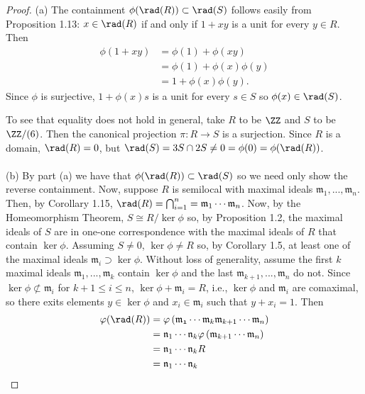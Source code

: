 \begin{proof}
(a) The containment $\phi(\rad(R))\subset\rad(S)$ follows easily
from Proposition 1.13: $x\in\rad(R)$ if and only if $1+xy$ is a
unit for every $y\in R$. Then
\begin{align*}
\phi(1+xy)&=\phi(1)+\phi(xy)\\
          &=\phi(1)+\phi(x)\phi(y)\\
          &=1+\phi(x)\phi(y).
\end{align*}
Since $\phi$ is surjective, $1+\phi(x)s$ is a unit for every
$s\in S$ so $\phi(x)\in\rad(S)$.

To see that equality does not hold in general, take $R$ to be
$\ZZ$ and $S$ to be $\ZZ/(6)$. Then the canonical projection
$\pi\colon R\to S$ is a surjection. Since $R$ is a domain,
$\rad(R)=0$, but $\rad(S)= 3S\cap 2S\neq
0=\phi(0)=\phi(\rad(R))$.
\\\\
(b) By part (a) we have that $\phi(\rad(R))\subset\rad(S)$ so we
need only show the reverse containment. Now, suppose $R$ is
semilocal with maximal ideals
$\mathfrak{m}_1,...,\mathfrak{m}_n$. Then, by Corollary 1.15,
$\rad(R)=\bigcap_{i=1}^n=\mathfrak{m}_1\cdots\mathfrak{m}_n$. Now,
by the Homeomorphism Theorem, $S\cong R/\ker\phi$ so, by
Proposition 1.2, the maximal ideals of $S$ are in one-one
correspondence with the maximal ideals of $R$ that contain
$\ker\phi$. Assuming $S\neq 0$, $\ker\phi\neq R$ so, by Corollary
1.5, at least one of the maximal ideals
$\mathfrak{m}_i\supset\ker\phi$. Without loss of generality,
assume the first $k$ maximal ideals
$\mathfrak{m}_1,...,\mathfrak{m}_k$ contain $\ker\phi$ and the
last $\mathfrak{m}_{k+1},...,\mathfrak{m}_n$ do not. Since
$\ker\phi\nsubset\mathfrak{m}_i$ for $k+1\leq i\leq n$,
$\ker\phi+\mathfrak{m}_i=R$, i.e., $\ker\phi$ and
$\mathfrak{m}_i$ are comaximal, so there exits elements
$y\in\ker\phi$ and $x_i\in\mathfrak{m}_i$ such that
$y+x_i=1$. Then
\begin{align*}
\varphi(\rad(R))
&=
\varphi\left(\mathfrak{m_1}\cdots\mathfrak{m}_k\mathfrak{m}_{k+1}\cdots\mathfrak{m}_n\right)\\
&=
\mathfrak{n}_1\cdots\mathfrak{n}_k\varphi\left(\mathfrak{m}_{k+1}\cdots\mathfrak{m}_n\right)\\
&=\mathfrak{n}_1\cdots\mathfrak{n}_k R\\
&=\mathfrak{n}_1\cdots\mathfrak{n}_k
\end{align*}

\end{proof}
\newpage

